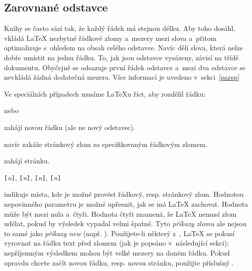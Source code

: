 \subsection{Zarovnané odstavce}

Knihy se často sází tak, že každý řádek má stejnou délku. Aby toho
dosáhl, vkládá \LaTeX{}
nezbytné řádkové zlomy a~mezery mezi slova a~přitom optimalizuje
s~ohledem na obsah celého odstavce. Navíc dělí slova, která
nelze dobře umístit na jednu řádku. To, jak jsou odstavce vysázeny,
závisí na třídě dokumentu. Obyčejně se odsazuje první řádek odstavce
a~mezi dva odstavce se nevkládá žádná dodatečná mezera. Více informací
je uvedeno v~sekci~\ref{parsp}%

Ve speciálních případech musíme \LaTeX u říct, aby rozdělil řádku:

\begin{lscommand}
\ci{\bs} nebo  
\end{lscommand}
\noindent zahájí novou řádku (ale ne nový odstavec). 

\begin{lscommand}
\ci{\bs*}
\end{lscommand}
\noindent navíc zakáže stránkový zlom za specifikovaným řádkovým zlomem.

\begin{lscommand}
\end{lscommand}
\noindent zahájí stránku.

\begin{lscommand}
\verb|[|\emph{n}\verb|]|,
\verb|[|\emph{n}\verb|]|, 
\verb|[|\emph{n}\verb|]|,
\verb|[|\emph{n}\verb|]|
\end{lscommand}
\noindent indikuje místa, kde je možné provést řádkový, resp. stránkový
zlom. Hodnotou nepovinného parametru je možné upřesnit, jak se má
\LaTeX{} zachovat. Hodnota může být mezi nula a~čtyři. Hodnota čtyři
znamená, že \LaTeX{} nemusí zlom udělat, pokud by výsledek vypadal
velmi špatně. Tyto \emph{příkazy zlomu} ale nejsou to samé jako
\emph{příkazy new} (např. ). Použijete-li některý
z~, \LaTeX{} se pokusí vyrovnat na řádku text 
před zlomem (jak je popsáno v~následující sekci); nepříjemným výsledkem
mohou být velké mezery na daném řádku. Pokud opravdu chcete začít
novou řádku, resp. novou stránku, použijte příslušný .

